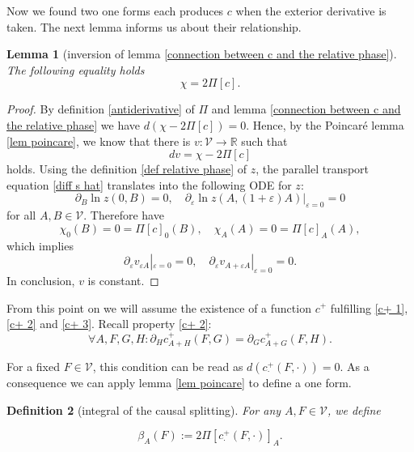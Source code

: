 \documentclass[b5paper,draft,openbib,12pt]{memoir}
\newtheorem{Def}{Definition}
\newtheorem{Lemma}[Def]{Lemma}
\begin{document}
Now we found two one forms each produces \(c\) when the exterior derivative is taken. The next lemma informs us about their relationship.

\begin{Lemma}[inversion of lemma \ref{connection between c and the relative phase}]
The following equality holds
\begin{equation}
\chi=2 \Pi\![c].
\end{equation}
\end{Lemma}
\begin{proof}
By definition \ref{antiderivative} of \(\Pi\) and 
lemma \ref{connection between c and the relative phase}
we have \(d(\chi-2 \Pi\![c])=0\). Hence, 
by the Poincaré lemma 
\ref{lem poincare}, we know that there is 
\(v:\mathcal{V}\rightarrow \mathbb{R}\) such that
\begin{equation}
dv=\chi-2 \Pi\![c]
\end{equation}%
holds. Using the definition \ref{def relative phase} of \(z\), 
 the parallel transport equation \eqref{diff s hat} 
 translates into the 
following ODE for \(z\):
\begin{equation}
\partial_B \ln z(0,B)=0, \quad \partial_\varepsilon \ln z(A,(1+\varepsilon)A)|_{\varepsilon =0}=0
\end{equation}
for all \(A,B\in\mathcal{V}\). Therefore have
\begin{equation}
\chi_0(B)=0=\Pi\![c]_0(B), \quad \chi_{A}(A)=0=\Pi\![c]_A(A),
\end{equation}
which implies
\begin{equation}
\partial_\varepsilon v_{\varepsilon A}|_{\varepsilon=0}=0, 
\quad \partial_\varepsilon v_{A+\varepsilon A}|_{\varepsilon=0}=0.
\end{equation}
In conclusion, \(v\) is constant.
\end{proof}


From this point on we will assume the existence of  a function \(c^+\) fulfilling \eqref{c+ 1},\eqref{c+ 2} and \eqref{c+ 3}.
Recall property \eqref{c+ 2}: 
\begin{equation}
\forall A,F,G,H: \partial_H c_{A+H}^+(F,G)=\partial_G c^+_{A+G}(F,H).
\end{equation}

For a fixed \(F\in\mathcal{V}\), this condition can be read as \(d( c^+_{\cdot} (F,\cdot))=0\). As a consequence we can apply lemma \ref{lem poincare} to define a one form.

\begin{Def}[integral of the causal splitting]
For any \(A,F\in\mathcal{V}\), we define

\begin{equation}
\beta_A(F):=2 \Pi\![c^+_{\cdot}(F,\cdot)]_A.
\end{equation}
\end{Def}
\end{document}

